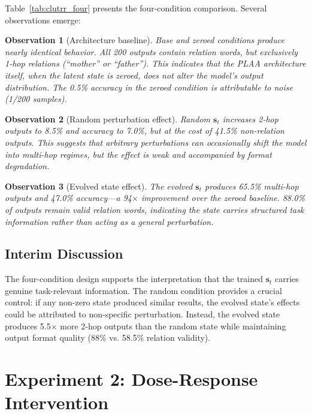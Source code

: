 \documentclass[11pt,a4paper]{article}
\newtheorem{observation}{Observation}
\begin{document}
Table~\ref{tab:clutrr_four} presents the four-condition comparison. Several observations emerge:

\begin{observation}[Architecture baseline]
Base and zeroed conditions produce nearly identical behavior. All 200 outputs contain relation words, but exclusively 1-hop relations (``mother'' or ``father''). This indicates that the PLAA architecture itself, when the latent state is zeroed, does not alter the model's output distribution. The 0.5\% accuracy in the zeroed condition is attributable to noise (1/200 samples).
\end{observation}

\begin{observation}[Random perturbation effect]
Random $\mathbf{s}_t$ increases 2-hop outputs to 8.5\% and accuracy to 7.0\%, but at the cost of 41.5\% non-relation outputs. This suggests that arbitrary perturbations can occasionally shift the model into multi-hop regimes, but the effect is weak and accompanied by format degradation.
\end{observation}

\begin{observation}[Evolved state effect]
The evolved $\mathbf{s}_t$ produces 65.5\% multi-hop outputs and 47.0\% accuracy---a 94$\times$ improvement over the zeroed baseline. 88.0\% of outputs remain valid relation words, indicating the state carries structured task information rather than acting as a general perturbation.
\end{observation}

\subsection{Interim Discussion}

The four-condition design supports the interpretation that the trained $\mathbf{s}_t$ carries genuine task-relevant information. The random condition provides a crucial control: if any non-zero state produced similar results, the evolved state's effects could be attributed to non-specific perturbation. Instead, the evolved state produces 5.5$\times$ more 2-hop outputs than the random state while maintaining output format quality (88\% vs. 58.5\% relation validity).

\section{Experiment 2: Dose-Response Intervention}
\label{sec:dose}
\end{document}
